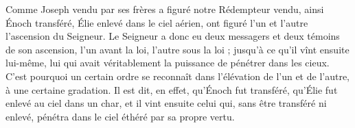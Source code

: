 Comme Joseph vendu par ses frères a figuré notre Rédempteur vendu, ainsi Énoch transféré, Élie enlevé dans le ciel aérien, ont figuré l’un et l’autre l’ascension du Seigneur. Le Seigneur a donc eu deux messagers et deux témoins de son ascension, l’un avant la loi, l’autre sous la loi ; jusqu’à ce qu’il vînt ensuite lui-même, lui qui avait véritablement la puissance de pénétrer dans les cieux. C’est pourquoi un certain ordre se reconnaît dans l’élévation de l’un et de l’autre, à une certaine gradation. Il est dit, en effet, qu’Énoch fut transféré, qu’Élie fut enlevé au ciel dans un char, et il vint ensuite celui qui, sans être transféré ni enlevé, pénétra dans le ciel éthéré par sa propre vertu.